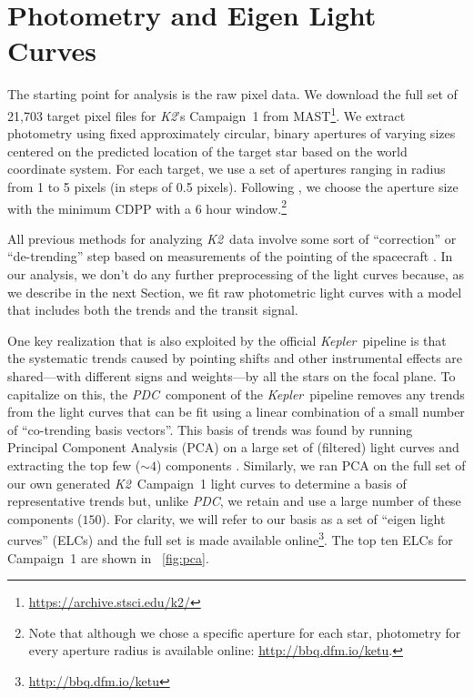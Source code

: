 \documentclass[12pt,preprint]{aastex}
\newcommand{\project}[1]{\textsl{#1}} %
\newcommand{\kepler}{\project{Kepler}}
\newcommand{\KT}{\project{K2}}
\newcommand{\pdc}{\project{PDC}}
\newcommand{\figref}[1]{\ref{fig:#1}}
\newcommand{\Fig}[1]{\figurename~\figref{#1}}
\newcommand{\sectionname}{Section}
\newcommand{\sectlabel}[1]{\label{sect:#1}}
\newcommand{\datareleaseurl}{{\url{http://bbq.dfm.io/ketu}}}
\begin{document}
\section{Photometry and Eigen Light Curves}
\sectlabel{phot}

The starting point for analysis is the raw pixel data.
We download the full set of 21,703 target pixel files for \KT's Campaign~1
from MAST\footnote{\url{https://archive.stsci.edu/k2/}}.
We extract photometry using fixed approximately circular, binary apertures of
varying sizes centered on the predicted location of the target star based on
the world coordinate system.
For each target, we use a set of apertures ranging in radius from 1 to 5
pixels (in steps of 0.5 pixels).
Following \citet{Vanderburg:2014}, we choose the aperture size with the
minimum CDPP \citep{cdpp} with a 6 hour window.\footnote{Note that although we
chose a specific aperture for each star, photometry for every aperture radius
is available online: \datareleaseurl.}

All previous methods for analyzing \KT\ data involve some sort of
``correction'' or ``de-trending'' step based on measurements of the pointing
of the spacecraft \citep{Vanderburg:2014, Aigrain:2015, Crossfield:2015}.
In our analysis, we don't do any further preprocessing of the light curves
because, as we describe in the next \sectionname, we fit raw photometric light
curves with a model that includes both the trends and the transit signal.

One key realization that is also exploited by the official \kepler\ pipeline
is that the systematic trends caused by pointing shifts and other instrumental
effects are shared---with different signs and weights---by all the stars on
the focal plane.
To capitalize on this, the \pdc\ component of the \kepler\ pipeline
removes any trends from the light curves that can be fit using a linear
combination of a small number of ``co-trending basis vectors''.
This basis of trends was found by running Principal Component Analysis (PCA)
on a large set of (filtered) light curves and extracting the top few ($\sim 4$)
components \citep{pdc1, pdc2}.
Similarly, we ran PCA on the full set of our own generated \KT\ Campaign~1
light curves to determine a basis of representative trends but, unlike \pdc,
we retain and use a large number of these components ($150$).
For clarity, we will refer to our basis as a set of ``eigen light curves''
(ELCs) and the full set is made available online\footnote{\datareleaseurl}.
The top ten ELCs for Campaign~1 are shown in \Fig{pca}.
\end{document}
